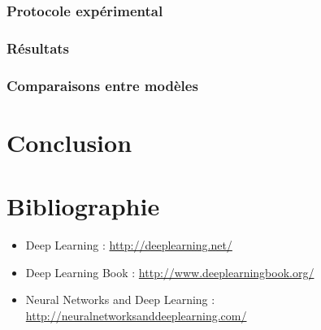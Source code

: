 \documentclass[a4paper, 11pt]{report}
\begin{document}
\subsection{Protocole expérimental}
\subsection{Résultats}
\subsection{Comparaisons entre modèles}
\chapter{Conclusion}
\chapter*{Bibliographie}
\begin{itemize}
	\item Deep Learning : \url{http://deeplearning.net/}
	\item Deep Learning Book : \url{http://www.deeplearningbook.org/}
	\item Neural Networks and Deep Learning : \url{http://neuralnetworksanddeeplearning.com/}
\end{itemize}
\end{document}
